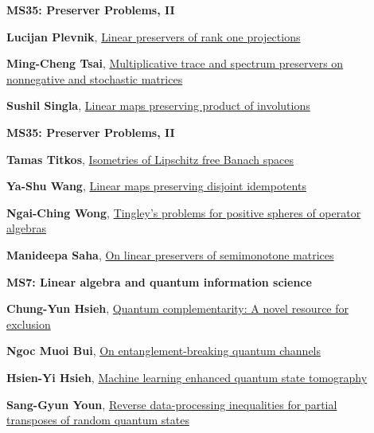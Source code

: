 \documentclass[ILAS2025-program.tex]{subfiles}
\begin{document}
        \begin{description}
    \item[] {\color{mstitle}\textbf{MS35: Preserver Problems, II}} 
    \item[] \hypertarget{up0280}{}\textbf{Lucijan Plevnik}, \hyperlink{down0280}{Linear preservers of rank one projections}
        \item[] \hypertarget{up0281}{}\textbf{Ming-Cheng Tsai}, \hyperlink{down0281}{Multiplicative trace and spectrum preservers  on   nonnegative and stochastic matrices
}
        \item[] \hypertarget{up0282}{}\textbf{Sushil Singla}, \hyperlink{down0282}{Linear maps preserving product of involutions}
        \end{description}
    \begin{description}
    \item[] {\color{mstitle}\textbf{MS35: Preserver Problems, II}} 
    \item[] \hypertarget{up0315}{}\textbf{Tamas Titkos}, \hyperlink{down0315}{Isometries of Lipschitz free Banach spaces}
        \item[] \hypertarget{up0316}{}\textbf{Ya-Shu Wang}, \hyperlink{down0316}{Linear maps preserving disjoint idempotents
}
        \item[] \hypertarget{up0317}{}\textbf{Ngai-Ching Wong}, \hyperlink{down0317}{Tingley's problems for positive spheres of operator algebras}
        \item[] \hypertarget{up0318}{}\textbf{Manideepa Saha}, \hyperlink{down0318}{On linear preservers of semimonotone matrices}
        \end{description}
    \begin{description}
    \item[] {\color{mstitle}\textbf{MS7: Linear algebra and quantum information science}} 
    \item[] \hypertarget{up0359}{}\textbf{Chung-Yun Hsieh}, \hyperlink{down0359}{Quantum complementarity: A novel resource for exclusion}
        \item[] \hypertarget{up0360}{}\textbf{Ngoc Muoi Bui}, \hyperlink{down0360}{On entanglement-breaking quantum channels}
        \item[] \hypertarget{up0361}{}\textbf{Hsien-Yi Hsieh}, \hyperlink{down0361}{Machine learning enhanced quantum state tomography}
        \item[] \hypertarget{up0362}{}\textbf{Sang-Gyun Youn}, \hyperlink{down0362}{Reverse data-processing inequalities for partial transposes of random quantum states}
        \end{description}
    \newpage
\end{document}
